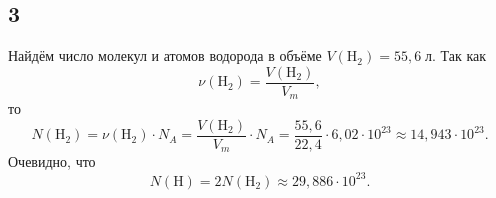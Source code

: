 \subsection{3}
Найдём число молекул и атомов водорода в объёме $V(\mathrm{H_2})=55{,}6\;\text{л}$. Так как
\[
\nu(\mathrm{H_2})=\frac{V(\mathrm{H_2})}{V_m},
\]
то
\[
N(\mathrm{H_2})=\nu(\mathrm{H_2})\cdot N_A=\frac{V(\mathrm{H_2})}{V_m}\cdot N_A=\frac{55{,}6}{22{,}4}\cdot6{,}02\cdot10^{23}\approx14{,}943\cdot10^{23}.
\]
Очевидно, что
\[
N(\mathrm{H})=2N(\mathrm{H_2})\approx29{,}886\cdot10^{23}.
\]